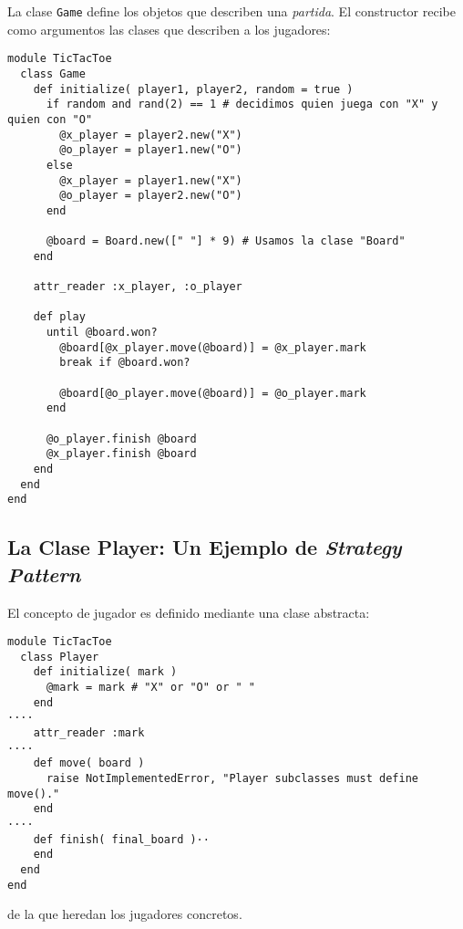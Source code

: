 La clase \verb|Game| define los objetos que describen una \emph{partida}.
El constructor recibe como argumentos las clases que describen a los jugadores:
\begin{verbatim}
module TicTacToe
  class Game
    def initialize( player1, player2, random = true )
      if random and rand(2) == 1 # decidimos quien juega con "X" y quien con "O"
        @x_player = player2.new("X")
        @o_player = player1.new("O")
      else
        @x_player = player1.new("X")
        @o_player = player2.new("O")
      end
      
      @board = Board.new([" "] * 9) # Usamos la clase "Board"
    end
    
    attr_reader :x_player, :o_player
    
    def play
      until @board.won?
        @board[@x_player.move(@board)] = @x_player.mark
        break if @board.won?
        
        @board[@o_player.move(@board)] = @o_player.mark
      end
      
      @o_player.finish @board
      @x_player.finish @board
    end
  end
end
\end{verbatim}

\subsection{La Clase Player: Un Ejemplo de \emph{Strategy Pattern}}

El concepto de jugador es definido mediante una clase abstracta:

\begin{verbatim}
module TicTacToe
  class Player
    def initialize( mark )
      @mark = mark # "X" or "O" or " "
    end
····
    attr_reader :mark
····
    def move( board )
      raise NotImplementedError, "Player subclasses must define move()."
    end
····
    def finish( final_board )··
    end
  end
end
\end{verbatim}
de la que heredan los jugadores concretos.

